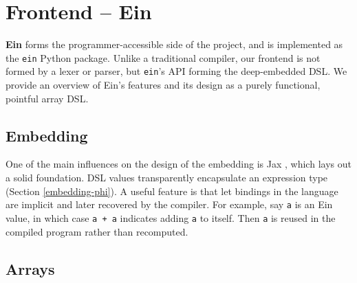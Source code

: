 \section{Frontend -- Ein}
\label{ein-dsl}

\textbf{Ein} forms the programmer-accessible side of the project, and is implemented as the \texttt{ein} Python package. Unlike a traditional compiler, our frontend is not formed by a lexer or parser, but \texttt{ein}'s API forming the deep-embedded DSL. We provide an overview of Ein's features and its design as a purely functional, pointful array DSL.

\subsection{Embedding}

One of the main influences on the design of the embedding is Jax \cite{frostig2018compiling}, which lays out a solid foundation.
DSL values transparently encapsulate an expression type (Section \ref{embedding-phi}).
A useful feature is that let bindings in the language are implicit and later recovered by the compiler.
For example, say \texttt{a} is an Ein value, in which case \texttt{a + a} indicates adding \texttt{a} to itself. 
Then \texttt{a} is reused in the compiled program rather than recomputed.

\subsection{Arrays}

